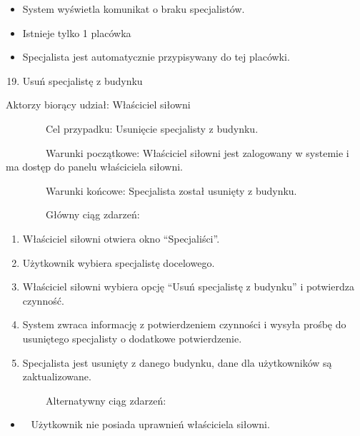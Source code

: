 \documentclass[
]{article}
\providecommand{\tightlist}{%
  \setlength{\itemsep}{0pt}\setlength{\parskip}{0pt}}
\begin{document}
\begin{itemize}
\tightlist
\item
  {System wyświetla komunikat o braku specjalistów.}
\end{itemize}

{}

{}

\begin{itemize}
\tightlist
\item
  {Istnieje tylko 1 placówka }
\end{itemize}

\begin{itemize}
\tightlist
\item
  {Specjalista jest automatycznie przypisywany do tej placówki.\\
  }
\end{itemize}

\begin{enumerate}
\setcounter{enumi}{18}
\tightlist
\item
  {Usuń specjalistę z budynku}
\end{enumerate}

{Aktorzy biorący udział: Właściciel siłowni}

{~~~~~~~~Cel przypadku: Usunięcie specjalisty z budynku.}

{~~~~~~~~Warunki początkowe: Właściciel siłowni jest zalogowany w
systemie i ma dostęp do panelu właściciela siłowni.}

{~~~~~~~~Warunki końcowe: Specjalista został usunięty z budynku.}

{~~~~~~~~Główny ciąg zdarzeń:}

\begin{enumerate}
\tightlist
\item
  {Właściciel siłowni otwiera okno ``Specjaliści''.}
\item
  {Użytkownik wybiera specjalistę docelowego.}
\item
  {Właściciel siłowni wybiera opcję ``Usuń specjalistę z budynku'' i
  potwierdza czynność.}
\item
  {System zwraca informację z potwierdzeniem czynności i wysyła prośbę
  do usuniętego specjalisty o dodatkowe potwierdzenie.}
\item
  {Specjalista jest usunięty z danego budynku, dane dla użytkowników są
  zaktualizowane.}
\end{enumerate}

{~~~~~~~~Alternatywny ciąg zdarzeń:}

\begin{itemize}
\tightlist
\item
  {~ Użytkownik nie posiada uprawnień właściciela siłowni.}
\end{itemize}
\end{document}
